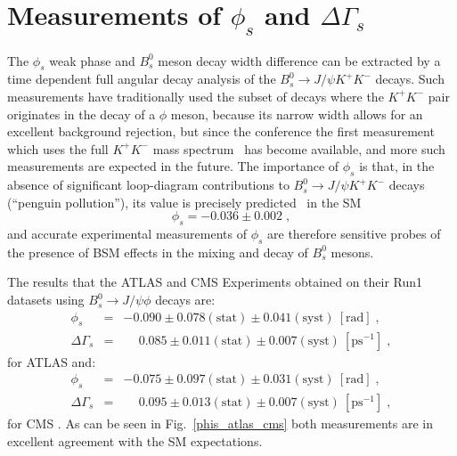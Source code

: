\section{Measurements of $\phi_s$ and $\Delta\Gamma_s$}
\label{sec:phisdgs}

The $\phi_s$ weak phase and $B^0_s$ meson decay width difference can
be extracted by a time dependent full angular decay analysis of the 
$B^0_s \to J/\psi K^+ K^-$ decays. Such measurements have traditionally
used the subset of decays where the $K^+ K^-$ pair originates in the decay
of a $\phi$ meson, because its narrow width allows for an excellent background
rejection, but since the conference the first measurement which uses
the full $K^+ K^-$ mass spectrum~\cite{LHCbKKHighMass} has become available, and
more such measurements are expected in the future. The importance of
$\phi_s$ is that, in the absence of significant loop-diagram contributions
to $B^0_s \to J/\psi K^+ K^-$ decays (``penguin pollution''),
its value is precisely predicted~\cite{PHISSM} in the SM
\begin{equation}  
\phi_s = -0.036 \pm 0.002 \; ,
\end{equation}
and accurate experimental measurements of $\phi_s$ are therefore 
sensitive probes of the presence of BSM effects in the mixing and decay of $B^0_s$ mesons.

The results that the ATLAS and CMS Experiments obtained on their Run1
datasets using $B^0_s \to J/\psi \phi$ decays are:
\begin{eqnarray}
  \phi_s & = & -0.090 \pm 0.078 (\mbox{stat}) \pm 0.041 (\mbox{syst})\:[\mbox{rad}] \; , \\
  \Delta\Gamma_s & = & \phantom{-}0.085 \pm 0.011 (\mbox{stat}) \pm 0.007 (\mbox{syst})\:[\mbox{ps}^{-1}]  \; ,
\end{eqnarray}
for ATLAS \cite{atlas_phis_8TeV} and:
\begin{eqnarray}
  \phi_s & = & -0.075 \pm 0.097 (\mbox{stat}) \pm 0.031 (\mbox{syst})\:[\mbox{rad}]  \; , \\
  \Delta\Gamma_s & = & \phantom{-}0.095 \pm 0.013 (\mbox{stat}) \pm 0.007 (\mbox{syst})\:[\mbox{ps}^{-1}]  \; ,
\end{eqnarray}
for CMS \cite{cms_phis}. As can be seen in Fig.~\ref{phis_atlas_cms} both measurements are in
excellent agreement with the SM expectations.


